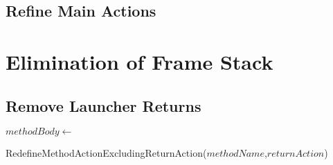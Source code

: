 \subsection{Refine Main Actions}

\RunningRefinementRule*

\section{Elimination of Frame Stack}

\subsection{Remove Launcher Returns}
\label{remove-launcher-returns-appendix-subsection}

\begin{algorithm}[htb!]
  \begin{algorithmic}[1]
    \State $methodBody \gets$ 
    \State {}
    \State {}
    \State {}
    \State {}
    \State {}
  \end{algorithmic}
  \caption{RedefineMethodActionExcludingReturnAction($methodName$,$returnAction$)}
  \label{redefine-method-action-excluding-return-action-algorithm}
\end{algorithm}

